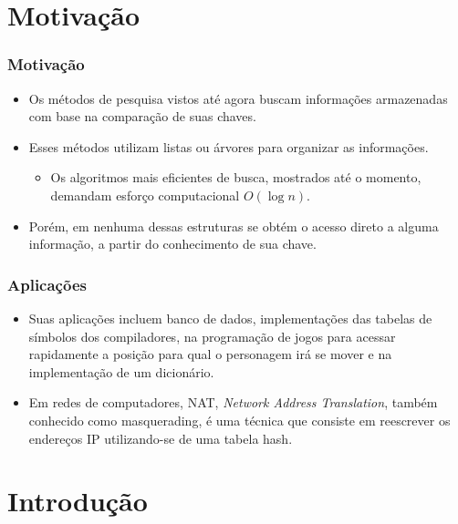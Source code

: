 \documentclass[aspectratio=169]{beamer}
\begin{document}
\section{Motivação} %

\begin{frame}
\frametitle{Motivação}
\begin{itemize}
 \item Os métodos de pesquisa vistos até agora buscam informações armazenadas com base na comparação de suas chaves.
 \item Esses métodos utilizam listas ou árvores para organizar as informações.
\begin{itemize}
\item Os algoritmos mais eficientes de busca, mostrados até o momento, demandam esforço computacional $O(\log n)$. 
\end{itemize}
 \item Porém, em nenhuma dessas estruturas se obtém o acesso direto a alguma informação, a partir do conhecimento de sua chave. 
\end{itemize}
\end{frame}

\begin{frame}
\frametitle{Aplicações}
\begin{itemize}
 \item Suas aplicações incluem banco de dados, implementações das tabelas de símbolos dos compiladores, na programação de jogos para acessar rapidamente a posição para qual o personagem irá se mover e na implementação de um dicionário.
 \item Em redes de computadores, NAT, {\it Network Address Translation}, também conhecido como masquerading, é uma técnica que consiste em reescrever os endereços IP utilizando-se de uma tabela hash.
\end{itemize}
\end{frame}


\section{Introdução} %
\end{document}
